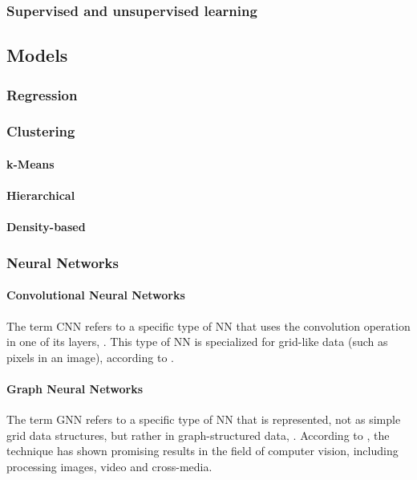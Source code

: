 \subsubsection{Supervised and unsupervised learning}

\subsection{Models}

\subsubsection{Regression}

\subsubsection{Clustering}

\paragraph*{k-Means}

\paragraph*{Hierarchical}

\paragraph*{Density-based}

\subsubsection{Neural Networks}

\paragraph*{Convolutional Neural Networks}

The term \ac{CNN} refers to a specific type of \ac{NN} that uses the convolution operation in one of its layers, \cite{Goodfellow2016}. This type of \ac{NN} is specialized for grid-like data (such as pixels in an image), according to \cite{Goodfellow2016, VALUEVA2020232}.

\paragraph*{Graph Neural Networks}

The term \ac{GNN} refers to a specific type of \ac{NN} that is represented, not as simple grid data structures, but rather in graph-structured data, \cite{GNN2022}. According to \cite{GNN2022}, the technique has shown promising results in the field of computer vision, including processing images, video and cross-media.